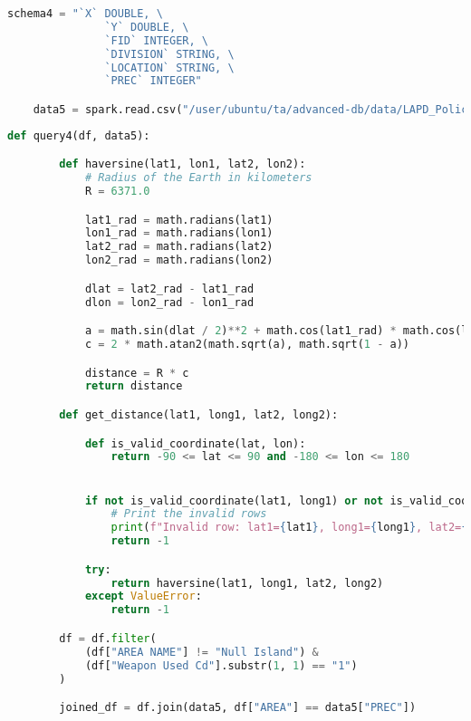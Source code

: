 \documentclass{article}
\begin{document}
\vspace{3mm}

\begin{lstlisting}[language = Python]
    schema4 = "`X` DOUBLE, \
               `Y` DOUBLE, \
               `FID` INTEGER, \
               `DIVISION` STRING, \
               `LOCATION` STRING, \
               `PREC` INTEGER"

    data5 = spark.read.csv("/user/ubuntu/ta/advanced-db/data/LAPD_Police_Stations.csv", header=True, schema=schema4)


\end{lstlisting}
    
\vspace{5mm}

\begin{lstlisting}[language = Python]
    def query4(df, data5):

        def haversine(lat1, lon1, lat2, lon2):
            # Radius of the Earth in kilometers
            R = 6371.0

            lat1_rad = math.radians(lat1)
            lon1_rad = math.radians(lon1)
            lat2_rad = math.radians(lat2)
            lon2_rad = math.radians(lon2)

            dlat = lat2_rad - lat1_rad
            dlon = lon2_rad - lon1_rad

            a = math.sin(dlat / 2)**2 + math.cos(lat1_rad) * math.cos(lat2_rad) * math.sin(dlon / 2)**2
            c = 2 * math.atan2(math.sqrt(a), math.sqrt(1 - a))

            distance = R * c
            return distance

        def get_distance(lat1, long1, lat2, long2):

            def is_valid_coordinate(lat, lon):
                return -90 <= lat <= 90 and -180 <= lon <= 180


            if not is_valid_coordinate(lat1, long1) or not is_valid_coordinate(lat2, long2):
                # Print the invalid rows
                print(f"Invalid row: lat1={lat1}, long1={long1}, lat2={lat2}, long2={long2}")
                return -1

            try:
                return haversine(lat1, long1, lat2, long2)
            except ValueError:
                return -1

        df = df.filter(
            (df["AREA NAME"] != "Null Island") &
            (df["Weapon Used Cd"].substr(1, 1) == "1")
        )

        joined_df = df.join(data5, df["AREA"] == data5["PREC"])


\end{lstlisting}
\end{document}
